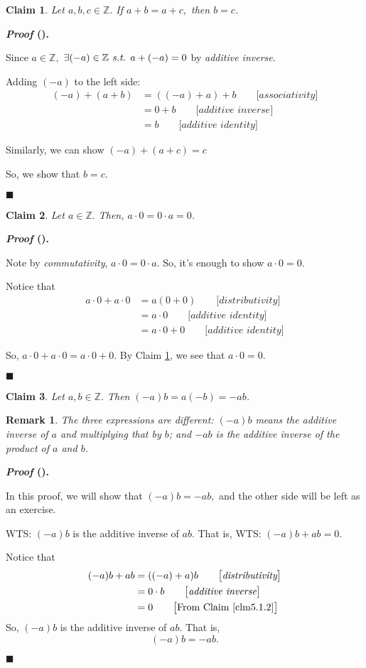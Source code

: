 \documentclass[12pt,a4paper]{article}
\newtheorem{clm}{Claim}[subsection]
\newcounter{nprf}[subsection]
\newtheorem*{rmk}{\indent Remark}
\newenvironment*{prf}{\par\indent\textbf{\textit{Proof} (\stepcounter{nprf}\thenprf). }\par }{\par\hfill $\blacksquare$\par}
\def\Z{{\mathbb{Z}}}
\def\st{\emph{ s.t. }}
\begin{document}
\begin{framed}
\begin{clm}\label{clm5.1.1}
	Let $a,b,c\in\Z.$ If $a+b=a+c,$ then $b=c$.
\end{clm}
\begin{prf}
	Since $a\in\Z,$ $\exists (-a)\in\Z\st a+(-a)=0$ by \textit{additive inverse}.\par Adding $(-a)$ to the left side: \[\begin{aligned}(-a)+(a+b)&=((-a)+a)+b\qquad\big[\textit{associativity}\big]\\&=0+b\qquad\big[\textit{additive inverse}\big]\\&=b\qquad\big[\textit{additive identity}\big]\end{aligned}\]\par Similarly, we can show $(-a)+(a+c)=c$\par So, we show that $b=c.$
\end{prf}
\end{framed}
\begin{framed}
\begin{clm}\label{clm5.1.2}
	Let $a\in\Z.$ Then, $a\cdot0=0\cdot a=0$.
\end{clm}
\begin{prf}
	Note by \textit{commutativity}, $a\cdot0=0\cdot a$. So, it's enough to show $a\cdot0=0.$\par Notice that \[\begin{aligned}a\cdot0+a\cdot0&=a(0+0)\qquad\big[\textit{distributivity}\big]\\&=a\cdot0\qquad\big[\textit{additive identity}\big]\\&=a\cdot0+0\qquad\big[\textit{additive identity}\big]\end{aligned}\]\par So, $a\cdot0+a\cdot0=a\cdot0+0.$ By Claim \ref{clm5.1.1}, we see that $a\cdot0=0.$
\end{prf}
\end{framed}
\begin{framed}
\begin{clm}
	Let	$a,b\in\Z.$ Then $(-a)b=a(-b)=-ab$.
\end{clm}
\begin{rmk}
	The three expressions are different: $(-a)b$ means the additive inverse of $a$ and multiplying that by $b$; and $-ab$ is the additive inverse of the product of $a$ and $b$.	
\end{rmk}
\begin{prf}	
	In this proof, we will show that $(-a)b=-ab,$ and the other side will be left as an exercise.\par WTS: $(-a)b$ is the additive inverse of $ab$. That is, WTS: $(-a)b+ab=0.$\par Notice that \[\begin{aligned}(-a)b+ab&=((-a)+a)b\qquad\big[\textit{distributivity}\big]\\&=0\cdot b\qquad\big[\textit{additive inverse}\big]\\&=0\qquad\big[\text{From Claim \ref{clm5.1.2}}\big]\end{aligned}\] So, $(-a)b$ is the additive inverse of $ab$. That is, \[(-a)b=-ab.\]
\end{prf}
\end{framed}
\end{document}
